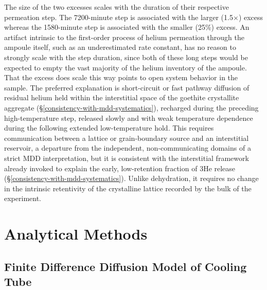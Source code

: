 The size of the two excesses scales with the duration of their respective permeation step. The 7200-minute step is associated with the larger (1.5$\times$) excess whereas the 1580-minute step is associated with the smaller (25\%) excess. An artifact intrinsic to the first-order process of helium permeation through the ampoule itself, such as an underestimated rate constant, has no reason to strongly scale with the step duration, since both of these long steps would be expected to empty the vast majority of the helium inventory of the ampoule. That the excess does scale this way points to open system behavior in the sample. The preferred explanation is short-circuit or fast pathway diffusion \citep{lee1992} of residual helium held within the interstitial space of the goethite crystallite aggregate (\S\ref{consistency-with-mdd-systematics}), recharged during the preceding high-temperature step, released slowly and with weak temperature dependence during the following extended low-temperature hold. This requires communication between a lattice or grain-boundary source and an interstitial reservoir, a departure from the independent, non-communicating domains of a strict MDD interpretation, but it is consistent with the interstitial framework already invoked to explain the early, low-retention fraction of 3He release (\S\ref{consistency-with-mdd-systematics}). Unlike dehydration, it requires no change in the intrinsic retentivity of the crystalline lattice recorded by the bulk of the experiment.

\clearpage

\section{Analytical Methods}\label{ch2-analytical-methods}

\subsection{Finite Difference Diffusion Model of Cooling Tube}\label{finite-difference-diffusion-model-of-cooling-tube}

